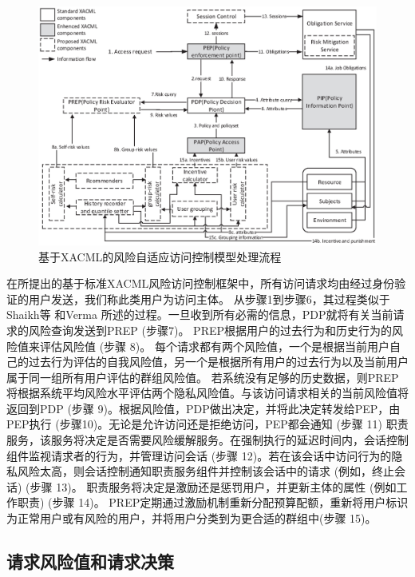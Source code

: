 \begin{figure}[htbp]
	\includegraphics[width=\linewidth]{./figures/Process_flow.eps}
	\caption{基于XACML的风险自适应访问控制模型处理流程}
	\label{fig:Process_flow}
\end{figure}

在所提出的基于标准XACML风险访问控制框架中，所有访问请求均由经过身份验证的用户发送，我们称此类用户为访问主体。 从步骤1到步骤6，其过程类似于Shaikh等\cite{shaikh2012dynamic} 和Verma \cite{verma2004xml}所述的过程。一旦收到所有必需的信息，PDP就将有关当前请求的风险查询发送到PREP (步骤7)。 PREP根据用户的过去行为和历史行为的风险值来评估风险值 (步骤 8)。 每个请求都有两个风险值，一个是根据当前用户自己的过去行为评估的自我风险值，另一个是根据所有用户的过去行为以及当前用户属于同一组所有用户评估的群组风险值。
若系统没有足够的历史数据，则PREP将根据系统平均风险水平评估两个隐私风险值。与该访问请求相关的当前风险值将返回到PDP (步骤 9)。根据风险值，PDP做出决定，并将此决定转发给PEP，由PEP执行 (步骤10)。无论是允许访问还是拒绝访问，PEP都会通知 (步骤 11) 职责服务，该服务将决定是否需要风险缓解服务。在强制执行的延迟时间内，会话控制组件监视请求者的行为，并管理访问会话 (步骤 12)。若在该会话中访问行为的隐私风险太高，则会话控制通知职责服务组件并控制该会话中的请求 (例如，终止会话) (步骤 13)。 职责服务将决定是激励还是惩罚用户，并更新主体的属性 (例如工作职责) (步骤 14)。 PREP定期通过激励机制重新分配预算配额，重新将用户标识为正常用户或有风险的用户，并将用户分类到为更合适的群组中(步骤 15)。

\subsection{请求风险值和请求决策}
\label{subsec:risk values and decision}

